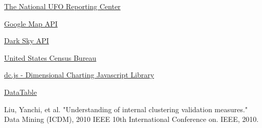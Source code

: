 \href{http://www.nuforc.org/}{The National UFO Reporting Center}

\href{https://developers.google.com/maps/documentation/javascript/}{Google Map API}

\href{https://darksky.net/dev/docs}{Dark Sky API}

\href{https://www.census.gov/}{United States Census Bureau}

\href{https://dc-js.github.io/dc.js/}{dc.js - Dimensional Charting Javascript Library}

\href{https://datatables.net/}{DataTable}

Liu, Yanchi, et al. "Understanding of internal clustering validation measures." Data Mining (ICDM), 2010 IEEE 10th International Conference on. IEEE, 2010.